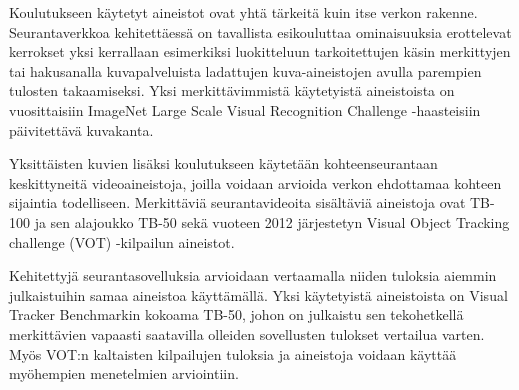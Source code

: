 Koulutukseen käytetyt aineistot ovat yhtä tärkeitä kuin itse verkon rakenne. Seurantaverkkoa
kehitettäessä on tavallista esikouluttaa ominaisuuksia erottelevat kerrokset yksi kerrallaan
esimerkiksi luokitteluun tarkoitettujen käsin merkittyjen tai hakusanalla kuvapalveluista
ladattujen kuva-aineistojen avulla parempien tulosten takaamiseksi. Yksi merkittävimmistä
käytetyistä aineistoista on vuosittaisiin ImageNet Large Scale Visual Recognition Challenge
-haasteisiin päivitettävä kuvakanta.

Yksittäisten kuvien lisäksi koulutukseen käytetään kohteenseurantaan keskittyneitä
videoaineistoja, joilla voidaan arvioida verkon ehdottamaa kohteen sijaintia todelliseen.
Merkittäviä seurantavideoita sisältäviä aineistoja ovat TB-100 ja sen alajoukko TB-50 sekä
vuoteen 2012 järjestetyn Visual Object Tracking challenge (VOT) -kilpailun aineistot.

Kehitettyjä seurantasovelluksia arvioidaan vertaamalla niiden tuloksia aiemmin julkaistuihin
samaa aineistoa käyttämällä. Yksi käytetyistä aineistoista on Visual Tracker Benchmarkin kokoama
TB-50, johon on julkaistu sen tekohetkellä merkittävien vapaasti saatavilla olleiden sovellusten
tulokset vertailua varten. Myös VOT:n kaltaisten kilpailujen tuloksia ja aineistoja voidaan
käyttää myöhempien menetelmien arviointiin.

\renewcommand{\thesubsection}{\oldsubection}
